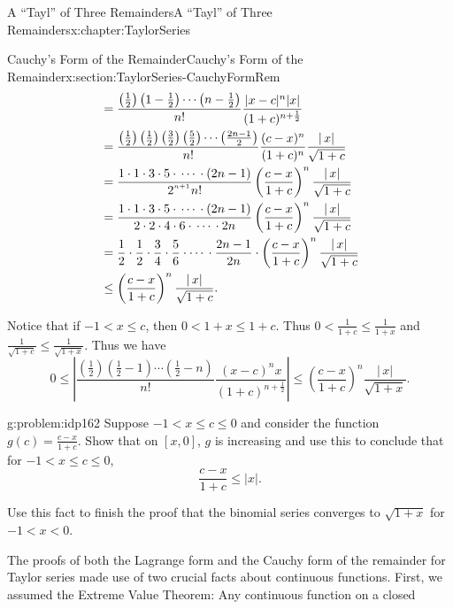 \begin{chapterptx}{A ``Tayl'' of Three Remainders}{}{A ``Tayl'' of Three Remainders}{}{}{x:chapter:TaylorSeries}
\begin{sectionptx}{Cauchy's Form of the Remainder}{}{Cauchy's Form of the Remainder}{}{}{x:section:TaylorSeries-CauchyFormRem}
\begin{align*}
			& =\frac{\left(\frac{1}{2}\right)\left(1-\frac{1}{2}\right)\cdots\left(n-\frac{1}{2}\right)}{n!}\frac{|x-c|^n|x|}{(1+c)^{n+\frac{1}{2}}}\\
			& =\frac{\left(\frac{1}{2}\right)\left(\frac{1}{2}\right)\left(\frac{3}{2}\right)\left(\frac{5}{2}\right)\cdots\left(\frac{2n-1}{2}\right)}{n!}\frac{(c-x)^n}{(1+c)^n}\frac{|\,x|}{\sqrt{1+c}}\\
			& =\frac{1\cdot 1\cdot 3\cdot 5\cdot\,\cdots\,\cdot\left(2n-1\right)}{2^{^{n+1}}n!}\left(\frac{c-x}{1+c}\right)^n\frac{|\,x|}{\sqrt{1+c}}\\
			& =\frac{1\cdot 1\cdot 3\cdot 5\cdot\,\cdots\,\cdot\left(2n-1\right)}{2\cdot 2\cdot 4\cdot 6\cdot\,\cdots\,\cdot 2n}\left(\frac{c-x}{1+c}\right)^n\frac{|\,x|}{\sqrt{1+c}}\\
			& =\frac{1}{2}\cdot\frac{1}{2}\cdot\frac{3}{4}\cdot\frac{5}{6}\cdot\cdots\,\cdot\frac{2n-1}{2n}\cdot\left(\frac{c-x}{1+c}\right)^n\frac{|\,x|}{\sqrt{1+c}}\\
			& \leq\left(\frac{c-x}{1+c}\right)^n\frac{|\,x|}{\sqrt{1+c}}\text{.}
		\end{align*}
		\par
		Notice that if \(-1\lt x\leq c\),\(\) then \(0\lt 1+x\leq 1+c\). Thus \(0\lt \frac{1}{1+c}\leq\frac{1}{1+x}\) and \(\frac{1}{\sqrt{1+c}}\leq\frac{1}{\sqrt{1+x}}\). Thus we have%
		\begin{equation*}
			0\leq\left|\frac{\left(\frac{1}{2}\right)\left(\frac{1}{2}-1\right)\cdots\left(\frac{1}{2}-n\right)}{n!}\frac{(x-c)^nx}{(1+c)^{n+\frac{1}{2}}}\right|\leq\left(\frac{c-x}{1+c}\right)^n\frac{|\,x|}{\sqrt{1+x}}\text{.}
		\end{equation*}
		\begin{problem}{}{g:problem:idp162}%
			 Suppose \(-1\lt x\leq c\leq 0\) and consider the function \(g(c)=\frac{c-x}{1+c}\). Show that on \([x,0]\), \(g\) is increasing and use this to conclude that for \(-1\lt x\leq c\leq 0\),%
			\begin{equation*}
				\frac{c-x}{1+c}\leq|x|\text{.}
			\end{equation*}
			\par
			Use this fact to finish the proof that the binomial series converges to \(\sqrt{1+x}\) for \(-1\lt x\lt 0\).%
		\end{problem}
		The proofs of both the Lagrange form and the Cauchy form of the remainder for Taylor series made use of two crucial facts about continuous functions. First, we assumed the Extreme Value Theorem: Any continuous function on a closed%

\end{sectionptx}
\end{chapterptx}
